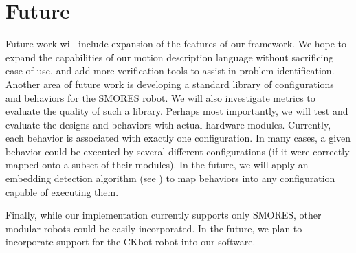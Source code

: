 \documentclass[graybox]{svmult}
\begin{document}
\section{Future}
Future work will include expansion of the features of our framework.  We hope to expand
the capabilities of our motion description language without sacrificing ease-of-use,
and add more verification tools to assist in problem identification. Another area of future work is developing a standard library of configurations and
behaviors for the SMORES robot.  We will also investigate metrics to evaluate the quality of such a library.
Perhaps most importantly, we will test and evaluate the designs and behaviors with actual hardware modules.
Currently, each behavior is associated with exactly one configuration. In many cases, a given behavior could be executed by several different configurations (if it were correctly mapped onto a subset of their modules). In the future, we will apply an embedding detection algorithm (see \cite{mantzouratos2014embeddability}) to map behaviors into any configuration capable of executing them.

Finally, while our implementation currently supports only SMORES, other modular
robots
could be easily incorporated. In the future, we plan to incorporate support
for the CKbot robot \cite{davey2012modlock} into our software. 

%
%


\end{document}
